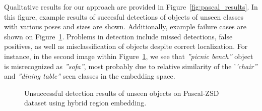 Qualitative results for our approach are provided in Figure~\ref{fig:pascal_results}. In this figure, example results of succesful detections
of objects of unseen classes with various poses and sizes are shown.
Additionally, example failure cases are shown on Figure~\ref{fig:pascal_results_failure}. Problems in detection include
missed detections, false positives, as well as misclassification of objects despite correct localization.
For instance, in the second image within
Figure~\ref{fig:pascal_results_failure}, we see that \textit{''picnic bench''} object is misrecognized  as \textit{''sofa''},
most probably due to relative similarity of the '\textit{'chair''} and \textit{''dining table''} seen classes in the embedding space.


\begin{figure}
\caption{Unsuccessful detection results of unseen objects on Pascal-ZSD dataset using hybrid region embedding.}
\label{fig:pascal_results_failure}
\end{figure}


